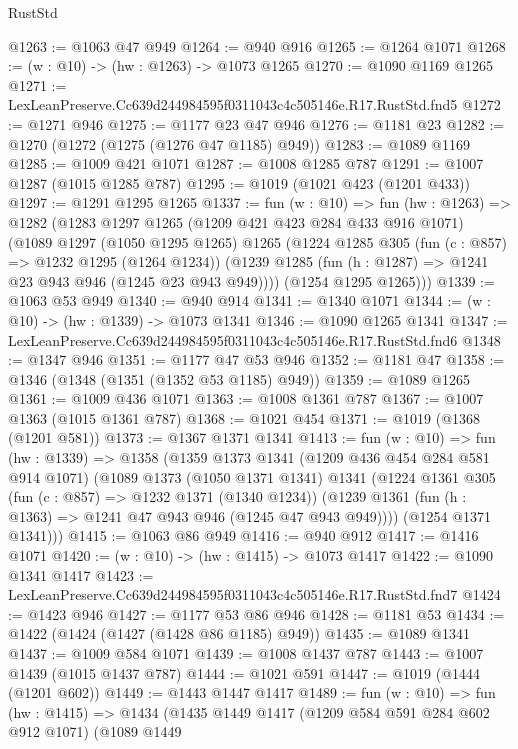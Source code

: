 \begin{lexlean}{RustStd}
\begin{coremodule}
@1263 := @1063 @47 @949
@1264 := @940 @916
@1265 := @1264 @1071
@1268 := (w : @10) -> (hw : @1263) -> @1073 @1265
@1270 := @1090 @1169 @1265
@1271 := LexLeanPreserve.Cc639d244984595f0311043c4c505146e.R17.RustStd.fnd5
@1272 := @1271 @946
@1275 := @1177 @23 @47 @946
@1276 := @1181 @23
@1282 := @1270 (@1272 (@1275 (@1276 @47 @1185) @949))
@1283 := @1089 @1169
@1285 := @1009 @421 @1071
@1287 := @1008 @1285 @787
@1291 := @1007 @1287 (@1015 @1285 @787)
@1295 := @1019 (@1021 @423 (@1201 @433))
@1297 := @1291 @1295 @1265
@1337 := fun (w : @10) =>
  fun (hw : @1263) =>
  @1282
    (@1283
      @1297
      @1265
      (@1209 @421 @423 @284 @433 @916 @1071)
      (@1089
        @1297
        (@1050 @1295 @1265)
        @1265
        (@1224
          @1285
          @305
          (fun (c : @857) => @1232 @1295 (@1264 @1234))
          (@1239 @1285 (fun (h : @1287) => @1241 @23 @943 @946 (@1245 @23 @943 @949))))
        (@1254 @1295 @1265)))
@1339 := @1063 @53 @949
@1340 := @940 @914
@1341 := @1340 @1071
@1344 := (w : @10) -> (hw : @1339) -> @1073 @1341
@1346 := @1090 @1265 @1341
@1347 := LexLeanPreserve.Cc639d244984595f0311043c4c505146e.R17.RustStd.fnd6
@1348 := @1347 @946
@1351 := @1177 @47 @53 @946
@1352 := @1181 @47
@1358 := @1346 (@1348 (@1351 (@1352 @53 @1185) @949))
@1359 := @1089 @1265
@1361 := @1009 @436 @1071
@1363 := @1008 @1361 @787
@1367 := @1007 @1363 (@1015 @1361 @787)
@1368 := @1021 @454
@1371 := @1019 (@1368 (@1201 @581))
@1373 := @1367 @1371 @1341
@1413 := fun (w : @10) =>
  fun (hw : @1339) =>
  @1358
    (@1359
      @1373
      @1341
      (@1209 @436 @454 @284 @581 @914 @1071)
      (@1089
        @1373
        (@1050 @1371 @1341)
        @1341
        (@1224
          @1361
          @305
          (fun (c : @857) => @1232 @1371 (@1340 @1234))
          (@1239 @1361 (fun (h : @1363) => @1241 @47 @943 @946 (@1245 @47 @943 @949))))
        (@1254 @1371 @1341)))
@1415 := @1063 @86 @949
@1416 := @940 @912
@1417 := @1416 @1071
@1420 := (w : @10) -> (hw : @1415) -> @1073 @1417
@1422 := @1090 @1341 @1417
@1423 := LexLeanPreserve.Cc639d244984595f0311043c4c505146e.R17.RustStd.fnd7
@1424 := @1423 @946
@1427 := @1177 @53 @86 @946
@1428 := @1181 @53
@1434 := @1422 (@1424 (@1427 (@1428 @86 @1185) @949))
@1435 := @1089 @1341
@1437 := @1009 @584 @1071
@1439 := @1008 @1437 @787
@1443 := @1007 @1439 (@1015 @1437 @787)
@1444 := @1021 @591
@1447 := @1019 (@1444 (@1201 @602))
@1449 := @1443 @1447 @1417
@1489 := fun (w : @10) =>
  fun (hw : @1415) =>
  @1434
    (@1435
      @1449
      @1417
      (@1209 @584 @591 @284 @602 @912 @1071)
      (@1089
        @1449

\end{coremodule}
\end{lexlean}
